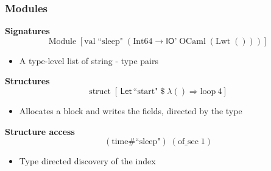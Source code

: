 \documentclass[aspectratio=169]{beamer}
\begin{document}
\begin{frame}[t]
  \frametitle{Modules}

  {\bf Signatures} 
  \begin{displaymath}
    \textrm{Module}\;[\mathrm{val}\;\textrm{``sleep"}\;(\mathrm{Int64} \to \textsf{IO'}\;\mathrm{OCaml}\;(\mathrm{Lwt}\;()))]
  \end{displaymath}
  \begin{itemize}
  \item A type-level list of string - type pairs
  \end{itemize}

  \bigskip
  \pause

  {\bf Structures}
  \begin{displaymath}
    \textrm{struct}\;[\,\textsf{Let}\,\textrm{``start"} \; \$ \; \lambda () \Rightarrow \mathrm{loop}~4 ]
  \end{displaymath}
  \begin{itemize}
  \item Allocates a block and writes the fields, directed by the type
  \end{itemize}

  \bigskip
  \pause

  {\bf Structure access}
  \begin{displaymath}
    (\textrm{time}\#\textrm{``sleep"})\; (\mathrm{of\_sec}\; 1)
  \end{displaymath}
  \begin{itemize}
  \item Type directed discovery of the index
  \end{itemize}
\end{frame}

\end{document}
